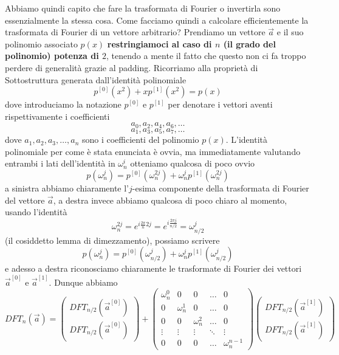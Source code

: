 \documentclass[11pt]{scrartcl}
\begin{document}
	Abbiamo quindi capito che fare la trasformata di Fourier o invertirla sono essenzialmente la stessa cosa. Come facciamo quindi a calcolare efficientemente la trasformata di Fourier di un vettore arbitrario? Prendiamo un vettore $\vec{a}$ e il suo polinomio associato $p(x)$ \textbf{restringiamoci al caso di $n$ (il grado del polinomio) potenza di $2$}, tenendo a mente il fatto che questo non ci fa troppo perdere di generalità grazie al padding. Ricorriamo alla proprietà di Sottostruttura generata dall'identità polinomiale
	$$p^{[0]}(x^2)+xp^{[1]}(x^2)=p(x)$$
	dove introduciamo la notazione $p^{[0]}$ e $p^{[1]}$ per denotare i vettori aventi rispettivamente i coefficienti
	$$a_0,a_2,a_4,a_6,\dots$$
	$$a_1,a_3,a_5,a_7,\dots$$
	dove $a_1,a_2,a_3,\dots,a_n$ sono i coefficienti del polinomio $p(x)$. L'identità polinomiale per come è stata enunciata è ovvia, ma immediatamente valutando entrambi i lati dell'identità in $\omega_n^i$ otteniamo qualcosa di poco ovvio
	$$p(\omega_n^j)=p^{[0]}\left(\omega_n^{2j}\right)+\omega_n^j p^{[1]}\left(\omega_n^{2j}\right)$$
	a sinistra abbiamo chiaramente l'$j$-esima componente della trasformata di Fourier del vettore $\vec{a}$, a destra invece abbiamo qualcosa di poco chiaro al momento, usando l'identità
	$$\omega_n^{2j}=e^{i\frac{2\pi}{n}2j}=e^{i\frac{2\pi j}{n/2}}=\omega^j_{n/2}$$
	(il cosiddetto lemma di dimezzamento), possiamo scrivere
	$$p\left(\omega^j_n\right)=p^{[0]}\left(\omega_{n/2}^{j}\right)+\omega_n^jp^{[1]}\left(\omega_{n/2}^j\right)$$	
	e adesso a destra riconosciamo chiaramente le trasformate di Fourier dei vettori $\vec{a}^{[0]}$ e $\vec{a}^{[1]}$. Dunque abbiamo
	$$
	DFT_n(\vec{a})=
	\left(
	\begin{array}{c}
		DFT_{n/2}\left(\vec{a}^{[0]}\right) \\
		\hline
		DFT_{n/2}\left(\vec{a}^{[0]}\right)
	\end{array}
	\right)
	+
	\begin{pmatrix}
		\omega_n^0 & 0 & 0 & \dots & 0 \\
		0 & \omega_n^1 & 0 & \dots & 0 \\
		0 & 0 & \omega_n^2 & \dots & 0 \\
		\vdots & \vdots & \vdots & \ddots & \vdots \\
		0 & 0 & 0 & \dots & \omega_n^{n-1}
	\end{pmatrix}
	\left(
	\begin{array}{c}
		DFT_{n/2}\left(\vec{a}^{[1]}\right) \\
		\hline
		DFT_{n/2}\left(\vec{a}^{[1]}\right)
	\end{array}
	\right)
	$$
\end{document}
